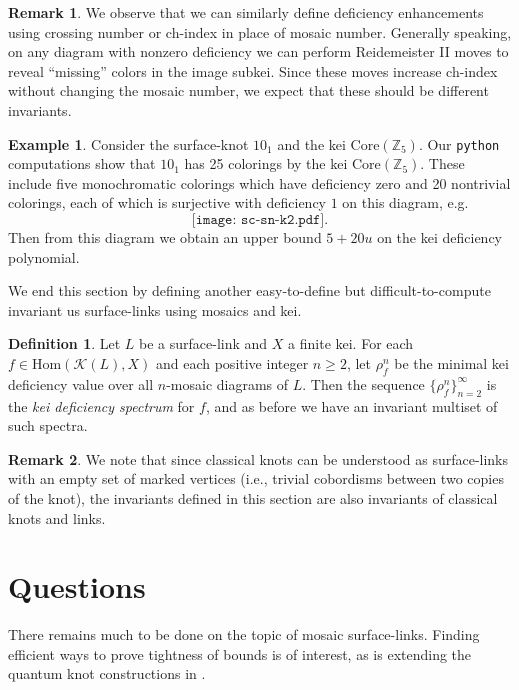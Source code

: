 \documentclass{article}
\theoremstyle{definition}
\newtheorem{example}{Example}
\newtheorem{definition}{Definition}
\newtheorem{remark}{Remark}
\begin{document}
\begin{remark}\label{rem:1}
We observe that we can similarly define deficiency enhancements using
crossing number or ch-index in place of mosaic number. Generally speaking,
on any diagram with nonzero deficiency we can perform Reidemeister II moves
to reveal ``missing'' colors in the image subkei. Since these moves increase 
ch-index without changing the mosaic number, we expect that these should be 
different invariants. 
\end{remark}


\begin{example}
Consider the surface-knot $10_1$ and the kei $\mathrm{Core}(\mathbb{Z}_5)$.
Our \texttt{python} computations show that $10_1$ has 25 colorings by the 
kei $\mathrm{Core}(\mathbb{Z}_5)$. These include five monochromatic colorings
which have deficiency zero and 20 nontrivial colorings, each of which is 
surjective with deficiency $1$ on this diagram, e.g.
\[\texttt{[image: sc-sn-k2.pdf]}.\]
Then from this diagram we obtain an upper bound $5+20u$ on the kei deficiency 
polynomial.
\end{example}

We end this section by defining another easy-to-define but difficult-to-compute
invariant us surface-links using mosaics and kei. 

\begin{definition}
Let $L$ be a surface-link and $X$ a finite kei. For each 
$f\in\mathrm{Hom}(\mathcal{K}(L),X)$ and each positive integer $n\ge 2$,
let $\rho_f^n$ be the minimal kei deficiency value over all $n$-mosaic 
diagrams of $L$.
Then the sequence $\{\rho_f^n\}_{n=2}^{\infty}$ is the \textit{kei deficiency 
spectrum} for $f$, and as before we have an invariant multiset of such
spectra.
\end{definition}

\begin{remark}
We note that since classical knots can be understood as surface-links with an
empty set of marked vertices (i.e., trivial cobordisms between two copies
of the knot), the invariants defined in this section are also invariants
of classical knots and links.
\end{remark}

\section{\large\textbf{Questions}}\label{Q}

There remains much to be done on the topic of mosaic surface-links. Finding
efficient ways to prove tightness of bounds is of interest, as is
extending the quantum knot constructions in \cite{LK}.
\end{document}
